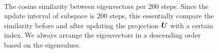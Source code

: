 \begin{figure}
\hfill
{}\\
\hfill
{}
    \caption{The cosine similarity between eigenvectors per 200 steps. Since the update interval of subspace is $200$ steps, this essentially compare the similarity before and after updating the projection ${\bm{U}}$ with a certain index. We always arrange the eigenvectors in a descending order based on the eigenvalues. }
    \label{fig: eigenspace cosine similiary}
\end{figure}



